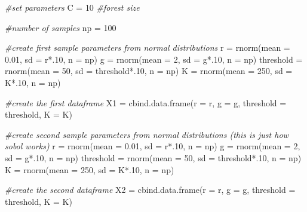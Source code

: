 \documentclass[
]{article}
\newenvironment{Shaded}{\begin{snugshade}}{\end{snugshade}}
\newcommand{\AttributeTok}[1]{\textcolor[rgb]{0.77,0.63,0.00}{#1}}
\newcommand{\CommentTok}[1]{\textcolor[rgb]{0.56,0.35,0.01}{\textit{#1}}}
\newcommand{\DecValTok}[1]{\textcolor[rgb]{0.00,0.00,0.81}{#1}}
\newcommand{\FloatTok}[1]{\textcolor[rgb]{0.00,0.00,0.81}{#1}}
\newcommand{\FunctionTok}[1]{\textcolor[rgb]{0.00,0.00,0.00}{#1}}
\newcommand{\NormalTok}[1]{#1}
\newcommand{\OtherTok}[1]{\textcolor[rgb]{0.56,0.35,0.01}{#1}}
\newcommand{\SpecialCharTok}[1]{\textcolor[rgb]{0.00,0.00,0.00}{#1}}
\begin{document}
\begin{Shaded}
\begin{Highlighting}[]
\CommentTok{\#set parameters }
\NormalTok{C }\OtherTok{=} \DecValTok{10} \CommentTok{\#forest size}

\CommentTok{\#number of samples }
\NormalTok{np }\OtherTok{=} \DecValTok{100} 

\CommentTok{\#create first sample parameters from normal distributions }
\NormalTok{r }\OtherTok{=} \FunctionTok{rnorm}\NormalTok{(}\AttributeTok{mean =} \FloatTok{0.01}\NormalTok{, }\AttributeTok{sd =}\NormalTok{ r}\SpecialCharTok{*}\NormalTok{.}\DecValTok{10}\NormalTok{, }\AttributeTok{n =}\NormalTok{ np)}
\NormalTok{g }\OtherTok{=} \FunctionTok{rnorm}\NormalTok{(}\AttributeTok{mean =} \DecValTok{2}\NormalTok{, }\AttributeTok{sd =}\NormalTok{ g}\SpecialCharTok{*}\NormalTok{.}\DecValTok{10}\NormalTok{, }\AttributeTok{n =}\NormalTok{ np)}
\NormalTok{threshold }\OtherTok{=} \FunctionTok{rnorm}\NormalTok{(}\AttributeTok{mean =} \DecValTok{50}\NormalTok{, }\AttributeTok{sd =}\NormalTok{ threshold}\SpecialCharTok{*}\NormalTok{.}\DecValTok{10}\NormalTok{, }\AttributeTok{n =}\NormalTok{ np)}
\NormalTok{K }\OtherTok{=} \FunctionTok{rnorm}\NormalTok{(}\AttributeTok{mean =} \DecValTok{250}\NormalTok{, }\AttributeTok{sd =}\NormalTok{ K}\SpecialCharTok{*}\NormalTok{.}\DecValTok{10}\NormalTok{, }\AttributeTok{n =}\NormalTok{ np)}

\CommentTok{\#create the first dataframe }
\NormalTok{X1 }\OtherTok{=} \FunctionTok{cbind.data.frame}\NormalTok{(}\AttributeTok{r =}\NormalTok{ r, }\AttributeTok{g =}\NormalTok{ g, }\AttributeTok{threshold =}\NormalTok{ threshold, }\AttributeTok{K =}\NormalTok{ K)}

\CommentTok{\#create second sample parameters from normal distributions (this is just how sobol works)}
\NormalTok{r }\OtherTok{=} \FunctionTok{rnorm}\NormalTok{(}\AttributeTok{mean =} \FloatTok{0.01}\NormalTok{, }\AttributeTok{sd =}\NormalTok{ r}\SpecialCharTok{*}\NormalTok{.}\DecValTok{10}\NormalTok{, }\AttributeTok{n =}\NormalTok{ np)}
\NormalTok{g }\OtherTok{=} \FunctionTok{rnorm}\NormalTok{(}\AttributeTok{mean =} \DecValTok{2}\NormalTok{, }\AttributeTok{sd =}\NormalTok{ g}\SpecialCharTok{*}\NormalTok{.}\DecValTok{10}\NormalTok{, }\AttributeTok{n =}\NormalTok{ np)}
\NormalTok{threshold }\OtherTok{=} \FunctionTok{rnorm}\NormalTok{(}\AttributeTok{mean =} \DecValTok{50}\NormalTok{, }\AttributeTok{sd =}\NormalTok{ threshold}\SpecialCharTok{*}\NormalTok{.}\DecValTok{10}\NormalTok{, }\AttributeTok{n =}\NormalTok{ np)}
\NormalTok{K }\OtherTok{=} \FunctionTok{rnorm}\NormalTok{(}\AttributeTok{mean =} \DecValTok{250}\NormalTok{, }\AttributeTok{sd =}\NormalTok{ K}\SpecialCharTok{*}\NormalTok{.}\DecValTok{10}\NormalTok{, }\AttributeTok{n =}\NormalTok{ np)}

\CommentTok{\#create the second dataframe }
\NormalTok{X2 }\OtherTok{=} \FunctionTok{cbind.data.frame}\NormalTok{(}\AttributeTok{r =}\NormalTok{ r, }\AttributeTok{g =}\NormalTok{ g, }\AttributeTok{threshold =}\NormalTok{ threshold, }\AttributeTok{K =}\NormalTok{ K)}
\end{Highlighting}
\end{Shaded}
\end{document}
